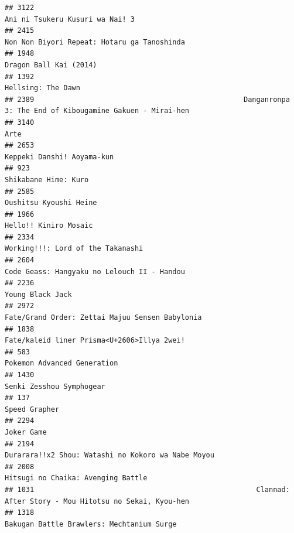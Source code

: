 \documentclass[
]{article}
\begin{document}
\begin{verbatim}
## 3122                                                                           Ani ni Tsukeru Kusuri wa Nai! 3
## 2415                                                               Non Non Biyori Repeat: Hotaru ga Tanoshinda
## 1948                                                                                    Dragon Ball Kai (2014)
## 1392                                                                                        Hellsing: The Dawn
## 2389                                                  Danganronpa 3: The End of Kibougamine Gakuen - Mirai-hen
## 3140                                                                                                      Arte
## 2653                                                                                Keppeki Danshi! Aoyama-kun
## 923                                                                                       Shikabane Hime: Kuro
## 2585                                                                                    Oushitsu Kyoushi Heine
## 1966                                                                                     Hello!! Kiniro Mosaic
## 2334                                                                         Working!!!: Lord of the Takanashi
## 2604                                                               Code Geass: Hangyaku no Lelouch II - Handou
## 2236                                                                                          Young Black Jack
## 2972                                                           Fate/Grand Order: Zettai Majuu Sensen Babylonia
## 1838                                                               Fate/kaleid liner Prisma<U+2606>Illya 2wei!
## 583                                                                                Pokemon Advanced Generation
## 1430                                                                                  Senki Zesshou Symphogear
## 137                                                                                              Speed Grapher
## 2294                                                                                                Joker Game
## 2194                                                        Durarara!!x2 Shou: Watashi no Kokoro wa Nabe Moyou
## 2008                                                                        Hitsugi no Chaika: Avenging Battle
## 1031                                                     Clannad: After Story - Mou Hitotsu no Sekai, Kyou-hen
## 1318                                                                 Bakugan Battle Brawlers: Mechtanium Surge

\end{verbatim}
\end{document}
